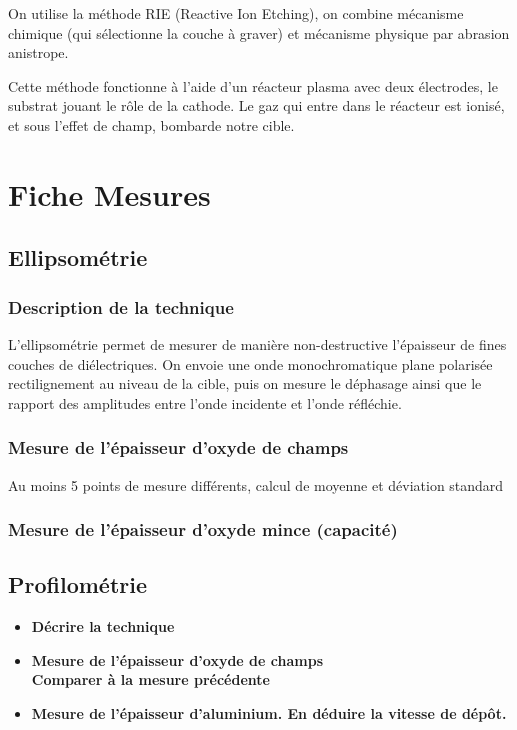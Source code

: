 \documentclass[11pt]{article}
\begin{document}
On utilise la m\'ethode RIE (Reactive Ion Etching), on combine m\'ecanisme chimique (qui s\'electionne la couche \`a graver) et m\'ecanisme physique par abrasion anistrope.

Cette m\'ethode fonctionne \`a l'aide d'un r\'eacteur plasma avec deux \'electrodes, le substrat jouant le rôle de la cathode. Le gaz qui entre dans le r\'eacteur est ionis\'e, et sous l'effet de champ, bombarde notre cible.


\clearpage

\section{Fiche Mesures}

\subsection{Ellipsom\'etrie}

\subsubsection{ Description de la technique }

L'ellipsom\'etrie permet de mesurer de manière non-destructive l'\'epaisseur de fines couches de di\'electriques. On envoie une onde monochromatique plane polaris\'ee rectilignement au niveau de la cible, puis on mesure le d\'ephasage ainsi que le rapport des amplitudes entre l'onde incidente et l'onde r\'efl\'echie. 

\subsubsection{Mesure de l'\'epaisseur d'oxyde de champs}
Au moins 5 points de mesure diff\'erents, calcul de moyenne et d\'eviation standard
\subsubsection{Mesure de l'\'epaisseur d'oxyde mince (capacit\'e)}


\subsection{Profilom\'etrie}

\begin{itemize}
\item \textbf{ D\'ecrire la technique  }
\item \textbf{ Mesure de l'\'epaisseur d'oxyde de champs \\ 
 Comparer \`a la mesure pr\'ec\'edente}
\item \textbf{ Mesure de l'\'epaisseur d'aluminium. En d\'eduire la vitesse de d\'ep\^ot.}
\end{itemize}
\end{document}
